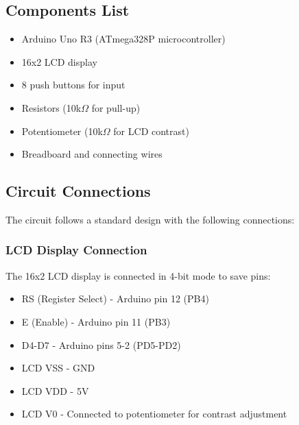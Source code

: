 \documentclass[12pt,a4paper]{article}
\begin{document}
\subsection{Components List}

\begin{itemize}
    \item Arduino Uno R3 (ATmega328P microcontroller)
    \item 16x2 LCD display
    \item 8 push buttons for input
    \item Resistors (10k$\Omega$ for pull-up)
    \item Potentiometer (10k$\Omega$ for LCD contrast)
    \item Breadboard and connecting wires
\end{itemize}

\subsection{Circuit Connections}

The circuit follows a standard design with the following connections:

\subsubsection{LCD Display Connection}
The 16x2 LCD display is connected in 4-bit mode to save pins:
\begin{itemize}
    \item RS (Register Select) - Arduino pin 12 (PB4)
    \item E (Enable) - Arduino pin 11 (PB3)
    \item D4-D7 - Arduino pins 5-2 (PD5-PD2)
    \item LCD VSS - GND
    \item LCD VDD - 5V
    \item LCD V0 - Connected to potentiometer for contrast adjustment
\end{itemize}
\end{document}
